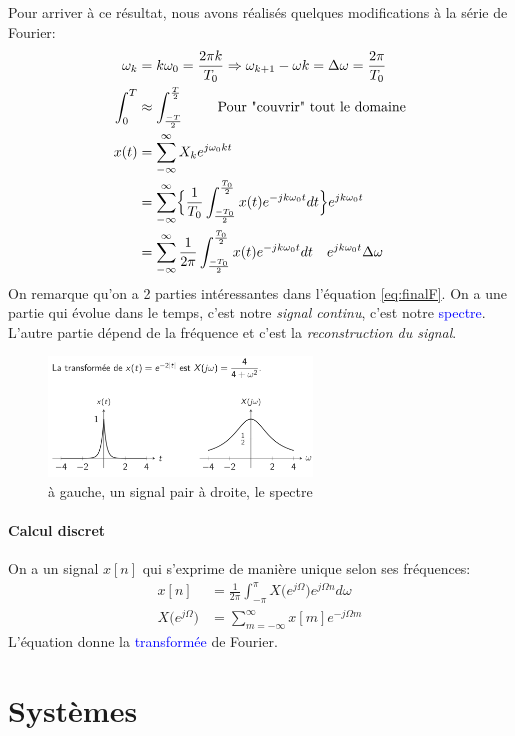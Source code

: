 \documentclass{report}
\begin{document}
Pour arriver à ce résultat, nous avons réalisés quelques modifications à la série de Fourier:
\begin{align}
\omega_k &= k \omega_0 = \frac{2 \pi k}{T_0} \Rightarrow \omega_{k+1} - \omega{k} = \Delta \omega = \frac{2\pi}{T_0}\\
\int_0^{T} & \approx \int_{\frac{-T}{2}}^{\frac{T}{2}} \qquad \text{ Pour "couvrir" tout le domaine}\\
x(t) &= \sum_{-\infty}^{\infty} X_k e^{j \omega_0 k t}\\
	 &= \sum_{-\infty}^{\infty} \Bigl \{ \frac{1}{T_0} \int_{\frac{-T_0}{2}}^{\frac{T_0}{2}} x(t) e^{-j k \omega_0 t} dt \Bigl \} e^{j k \omega_0 t}\\
	 &= \sum_{-\infty}^{\infty} \frac{1}{2 \pi} \int_{\frac{-T_0}{2}}^{\frac{T_0}{2}} x(t) e^{-j k \omega_0 t} dt\quad e^{j k \omega_0 t} \Delta \omega \label{eq:finalF}
\end{align} 
On remarque qu'on a 2 parties intéressantes dans l'équation \ref{eq:finalF}. On a une partie qui évolue dans le temps, c'est notre \textit{signal continu}, c'est notre \textcolor{blue}{spectre}. L'autre partie dépend de la fréquence et c'est la \textit{reconstruction du signal}. 
\begin{figure}[H]
\centering
\includegraphics[width=7cm]{img/reconstructionF.png}
\caption{à gauche, un signal pair \qquad à droite, le spectre}
\end{figure}

\subsection{Calcul discret}
On a un signal $x[n]$ qui s'exprime de manière unique selon ses fréquences:
\begin{align}
x[n] &= \frac{1}{2\pi}\int_{-\pi}^{\pi} X \bigl(e^{j\Omega} \bigl) e^{j\Omega n} d\omega\\
X\bigl(e^{j\Omega} \bigl) &= \sum_{m=-\infty}^{\infty} x[m]e^{-j\Omega m} \label{eq:transfoDF}
\end{align}
L'équation \label{eq:transfoDF} donne la \textcolor{blue}{transformée} de Fourier.


\part{Systèmes}
\end{document}
